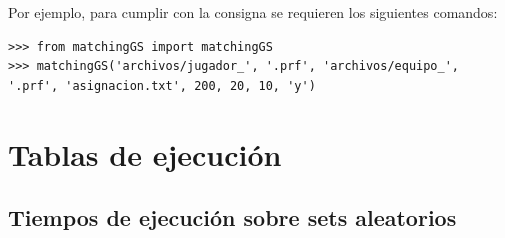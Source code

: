 \documentclass[article,a4paper]{article}
\begin{document}
Por ejemplo, para cumplir con la consigna se requieren los siguientes comandos:

\begin{verbatim}
>>> from matchingGS import matchingGS
>>> matchingGS('archivos/jugador_', '.prf', 'archivos/equipo_', '.prf', 'asignacion.txt', 200, 20, 10, 'y')
\end{verbatim}

\section{Tablas de ejecución}

\subsection{Tiempos de ejecución sobre sets aleatorios}
\end{document}
